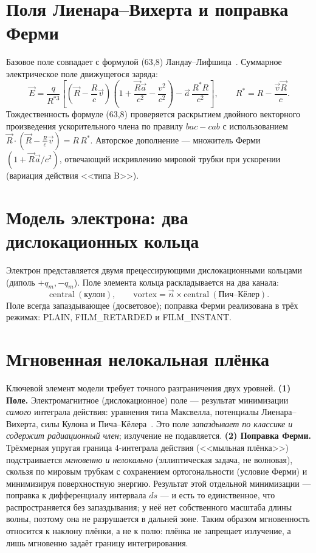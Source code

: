 \documentclass[11pt,a4paper]{article}
\begin{document}
\section{Поля Лиенара--Вихерта и поправка Ферми}
Базовое поле совпадает с формулой (63,8) Ландау--Лифшица~\cite{LL2}. Суммарное
электрическое поле движущегося заряда:
\begin{equation}
\vec{E}=\frac{q}{R^{*3}}\left[\left(\vec R-\frac{R}{c}\vec v\right)
\left(1+\frac{\vec R\vec a}{c^2}-\frac{v^2}{c^2}\right)
-\vec a\,\frac{R^{*}R}{c^2}\right],\qquad R^{*}=R-\frac{\vec v\vec R}{c}.
\end{equation}
Тождественность формуле (63,8) проверяется раскрытием двойного векторного
произведения ускорительного члена по правилу $bac-cab$ с использованием
$\vec R\cdot(\vec R-\tfrac{R}{c}\vec v)=R\,R^{*}$. Авторское дополнение ---
множитель Ферми $\left(1+\vec R\vec a/c^2\right)$, отвечающий искривлению
мировой трубки при ускорении (вариация действия <<типа B>>).

\section{Модель электрона: два дислокационных кольца}
Электрон представляется двумя прецессирующими дислокационными кольцами
(диполь $+q_m,-q_m$). Поле элемента кольца раскладывается на два канала:
\begin{equation}
\text{central}\ (\text{кулон}),\qquad \text{vortex}=\vec n\times\text{central}\ (\text{Пич--Кёлер}).
\end{equation}
Поле всегда запаздывающее (досветовое); поправка Ферми реализована в трёх
режимах: PLAIN, FILM\_RETARDED и FILM\_INSTANT.

\section{Мгновенная нелокальная плёнка}
Ключевой элемент модели требует точного разграничения двух уровней.
\textbf{(1) Поле.} Электромагнитное (дислокационное) поле --- результат
минимизации \emph{самого} интеграла действия: уравнения типа Максвелла,
потенциалы Лиенара--Вихерта, силы Кулона и Пича--Кёлера~\cite{LazarDyn2010,Braginsky2018}.
Это поле \emph{запаздывает по классике и содержит радиационный член};
излучение не подавляется. \textbf{(2) Поправка Ферми.} Трёхмерная упругая
граница 4-интеграла действия (<<мыльная плёнка>>) подстраивается
\emph{мгновенно и нелокально} (эллиптическая задача, не волновая),
скользя по мировым трубкам с сохранением ортогональности (условие Ферми) и
минимизируя поверхностную энергию. Результат этой отдельной минимизации ---
поправка к дифференциалу интервала $ds$ --- и есть то единственное, что
распространяется без запаздывания; у неё нет собственного масштаба длины
волны, поэтому она не разрушается в дальней зоне. Таким образом
мгновенность относится к наклону плёнки, а не к полю: плёнка не запрещает
излучение, а лишь мгновенно задаёт границу интегрирования.
\end{document}
